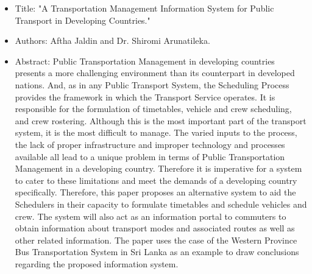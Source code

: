 \begin {itemize}
\item Title: "A Transportation Management Information System for Public Transport in Developing Countries."
\item Authors: Aftha Jaldin and Dr. Shiromi Arunatileka.
\item Abstract: Public Transportation Management in developing countries presents a more challenging environment than its counterpart in developed nations. And, as in any Public Transport System, the Scheduling Process provides the framework in which the Transport Service operates. It is responsible for the formulation of timetables, vehicle and crew scheduling, and crew rostering. Although this is the most important part of the transport system, it is the most difficult to manage. The varied inputs to the process, the lack of proper infrastructure and improper technology and processes available all lead to a unique problem in terms of Public Transportation Management in a developing country. Therefore it is imperative for a system to cater to these limitations and meet the demands of a developing country specifically. Therefore, this paper proposes an alternative system to aid the Schedulers in their capacity to formulate timetables and schedule vehicles and crew. The system will also act as an information portal to commuters to obtain information about transport modes and associated routes as well as other related information. The paper uses the case of the Western Province Bus Transportation System in Sri Lanka as an example to draw conclusions regarding the proposed information system.
\end {itemize}


